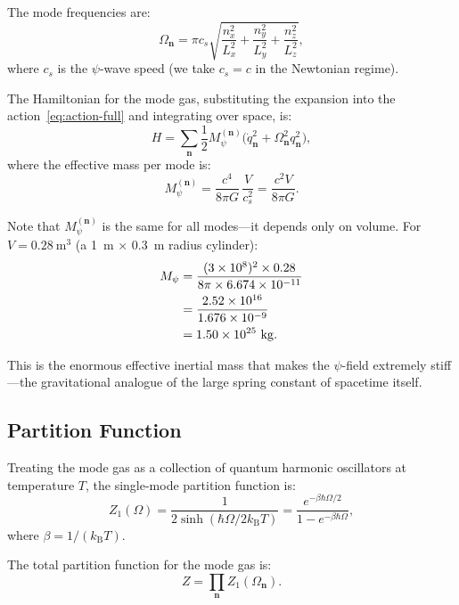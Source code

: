 \documentclass[aps,prd,twocolumn,showpacs,preprintnumbers,superscriptaddress,nofootinbib]{revtex4-2}
\newcommand{\kB}{k_{\mathrm{B}}}
\newcommand{\Mpsi}{M_\psi}
\begin{document}
The mode frequencies are:
\begin{equation}\label{eq:omega-n}
\Omega_{\mathbf{n}} = \pi c_s \sqrt{\frac{n_x^2}{L_x^2}
  + \frac{n_y^2}{L_y^2} + \frac{n_z^2}{L_z^2}},
\end{equation}
where $c_s$ is the $\psi$-wave speed (we take $c_s = c$ in the
Newtonian regime).

The Hamiltonian for the mode gas, substituting the expansion into the
action~\eqref{eq:action-full} and integrating over space, is:
\begin{equation}\label{eq:H-modes}
H = \sum_{\mathbf{n}} \frac{1}{2}\Mpsi^{(\mathbf{n})}
  \bigl(\dot{q}_{\mathbf{n}}^2 + \Omega_{\mathbf{n}}^2 q_{\mathbf{n}}^2\bigr),
\end{equation}
where the effective mass per mode is:
\begin{equation}\label{eq:Mpsi-mode}
\Mpsi^{(\mathbf{n})} = \frac{c^4}{8\pi G}\,\frac{V}{c_s^2}
  = \frac{c^2 V}{8\pi G}.
\end{equation}

Note that $\Mpsi^{(\mathbf{n})}$ is the same for all modes---it depends
only on volume.  For $V = 0.28~\mathrm{m^3}$ (a 1~m $\times$ 0.3~m
radius cylinder):
\begin{align}
\Mpsi &= \frac{(3\times 10^8)^2 \times 0.28}{8\pi \times 6.674\times 10^{-11}} \notag\\
  &= \frac{2.52\times 10^{16}}{1.676\times 10^{-9}} \notag\\
  &= 1.50 \times 10^{25}~\mathrm{kg}.
\end{align}

This is the enormous effective inertial mass that makes the $\psi$-field
extremely stiff---the gravitational analogue of the large spring constant
of spacetime itself.

\subsection{Partition Function}\label{sec:partition}

Treating the mode gas as a collection of quantum harmonic oscillators at
temperature $T$, the single-mode partition function is:
\begin{equation}\label{eq:Z1}
Z_1(\Omega) = \frac{1}{2\sinh(\hbar\Omega/2\kB T)}
  = \frac{e^{-\beta\hbar\Omega/2}}{1 - e^{-\beta\hbar\Omega}},
\end{equation}
where $\beta = 1/(\kB T)$.

The total partition function for the mode gas is:
\begin{equation}\label{eq:Ztot}
Z = \prod_{\mathbf{n}} Z_1(\Omega_{\mathbf{n}}).
\end{equation}
\end{document}
